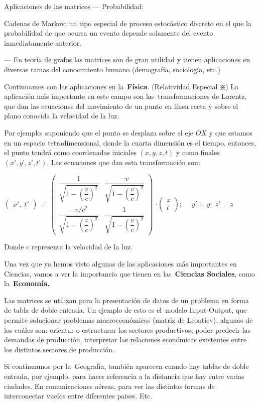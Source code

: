 \begin{myexampleblock}{Aplicaciones de las matrices}
--- Probabilidad: 

Cadenas de Markov: un tipo especial de proceso estocástico discreto en el que la probabilidad de que ocurra un evento depende solamente del evento inmediatamente anterior.

--- En teoría de grafos las matrices son de gran utilidad y tienen aplicaciones en diversas ramas del conocimiento humano (demografía, sociología, etc.)


Continuamos con las aplicaciones en la \textbf{Física}. (Relatividad Especial $\divideontimes$) La aplicación más importante en este campo son las transformaciones de Lorentz, que dan las ecuaciones del movimiento de un punto en línea recta y sobre el plano conocida la velocidad de la luz.

Por ejemplo: suponiendo que el punto se desplaza sobre el eje $OX$ y que estamos en un espacio tetradimensional, donde la cuarta dimensión es el tiempo, entonces, el punto tendrá como coordenadas iniciales $(x,y,z,t)$ y como finales $(x’,y’,z’,t’)$. Las ecuaciones que dan esta transformación son:

$\left( \begin{matrix} x', \; t'  \end{matrix} \right) =$
$\left( 
\begin{matrix}  \dfrac {1}{\sqrt{1- \left( \dfrac v c \right)^2}}  &\dfrac {-v}{\sqrt{1- \left( \dfrac v c \right)^2}}  \\ \dfrac {-v/c^2}{\sqrt{1- \left( \dfrac v c \right)^2}} &\dfrac {1}{\sqrt{1- \left( \dfrac v c \right)^2}} \end{matrix}
 \right)$
$ \cdot \left( \begin{matrix}  x \\ t \end{matrix} \right); \; \quad y'=y; \; z'=z$

Donde c representa la velocidad de la luz.


Una vez que ya hemos visto algunas de las aplicaciones más importantes en Ciencias, vamos a ver la importancia que tienen en las \textbf{Ciencias Sociales}, como la \textbf{Economía.}

Las matrices se utilizan para la presentación de datos de un problema en forma de tabla de doble entrada. Un ejemplo de esto es el modelo Input-Output, que permite solucionar problemas macroeconómicos (matriz de Leontiev), algunos de los cuáles son: orientar o estructurar los sectores productivos, poder predecir las demandas de producción, interpretar las relaciones económicas existentes entre los distintos sectores de producción.

Si continuamos por la Geografía, también aparecen cuando hay tablas de doble entrada, por ejemplo, para hacer referencia a la distancia que hay entre varias ciudades. En comunicaciones aéreas, para ver las distintas formas de interconectar vuelos entre diferentes paises. Etc.

\end{myexampleblock}






